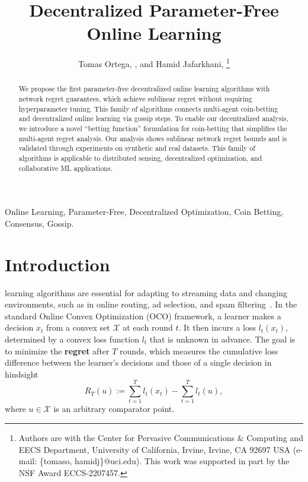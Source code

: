 \documentclass[journal]{IEEEtran} %
\title{Decentralized Parameter-Free Online Learning}
\author{Tomas Ortega, \IEEEmembership{Graduate Student Member, IEEE}, and Hamid Jafarkhani, \IEEEmembership{Fellow, IEEE}
    \thanks{
        Authors are with the Center for Pervasive Communications \& Computing and  EECS Department, University of California, Irvine, Irvine, CA 92697 USA (e-mail: \{tomaso, hamidj\}@uci.edu).
This work was supported in part by the NSF Award ECCS-2207457.
}
}
\begin{document}
\maketitle

\begin{abstract}
    We propose the first parameter-free decentralized online learning algorithms with network regret guarantees, which achieve sublinear regret without requiring hyperparameter tuning.
    This family of algorithms connects multi-agent coin-betting and decentralized online learning via gossip steps.
    To enable our decentralized analysis, we introduce a novel ``betting function'' formulation for coin-betting that simplifies the multi-agent regret analysis.
    Our analysis shows sublinear network regret bounds and is validated through experiments on synthetic and real datasets.
    This family of algorithms is applicable to distributed sensing, decentralized optimization, and collaborative ML applications.
\end{abstract}
\begin{IEEEkeywords}
    Online Learning, Parameter-Free, Decentralized Optimization, Coin Betting, Consensus, Gossip.
\end{IEEEkeywords}

\section{Introduction}
 learning algorithms are essential for adapting to streaming data and changing environments, such as in online routing, ad selection, and spam filtering~\cite{hazan_introduction_2023,shalev-shwartz_online_2011}.
In the standard Online Convex Optimization (OCO) framework, a learner makes a decision $x_{t}$ from a convex set $\mathcal{X}$ at each round $t$.
It then incurs a loss $l_{t}(x_{t})$, determined by a convex loss function $l_t$ that is unknown in advance.
The goal is to minimize the \textbf{regret} after $T$ rounds, which measures the cumulative loss difference between the learner's decisions and those of a single decision in hindsight
\begin{equation}
    R_{T}(u) := \sum_{t=1}^{T} l_{t}(x_t) - \sum_{t=1}^{T} l_{t}(u),
\end{equation}
where $u \in \mathcal{X}$ is an arbitrary comparator point.
\end{document}
